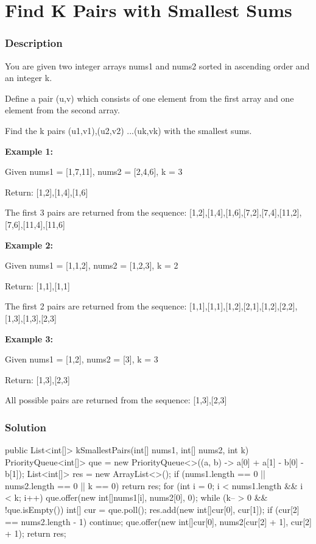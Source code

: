 \newpage

\section{Find K Pairs with Smallest Sums} %

\subsubsection{Description}
You are given two integer arrays nums1 and nums2 sorted in ascending order and an integer k.

Define a pair (u,v) which consists of one element from the first array and one element from the second array.

Find the k pairs (u1,v1),(u2,v2) ...(uk,vk) with the smallest sums.

\textbf{Example 1:}
\begin{Code}
Given nums1 = [1,7,11], nums2 = [2,4,6],  k = 3

Return: [1,2],[1,4],[1,6]

The first 3 pairs are returned from the sequence:
[1,2],[1,4],[1,6],[7,2],[7,4],[11,2],[7,6],[11,4],[11,6]
\end{Code}

\textbf{Example 2:}
\begin{Code}
Given nums1 = [1,1,2], nums2 = [1,2,3],  k = 2

Return: [1,1],[1,1]

The first 2 pairs are returned from the sequence:
[1,1],[1,1],[1,2],[2,1],[1,2],[2,2],[1,3],[1,3],[2,3]
\end{Code}

\textbf{Example 3:}
\begin{Code}
Given nums1 = [1,2], nums2 = [3],  k = 3

Return: [1,3],[2,3]

All possible pairs are returned from the sequence:
[1,3],[2,3]
\end{Code}
\subsubsection{Solution}

\begin{Code}
public List<int[]> kSmallestPairs(int[] nums1, int[] nums2, int k) {
    PriorityQueue<int[]> que = new PriorityQueue<>((a, b) -> a[0] + a[1] - b[0] - b[1]);
    List<int[]> res = new ArrayList<>();
    if (nums1.length == 0 || nums2.length == 0 || k == 0) return res;
    for (int i = 0; i < nums1.length && i < k; i++) que.offer(new int[]{nums1[i], nums2[0], 0});
    while (k-- > 0 && !que.isEmpty()) {
        int[] cur = que.poll();
        res.add(new int[]{cur[0], cur[1]});
        if (cur[2] == nums2.length - 1) continue;
        que.offer(new int[]{cur[0], nums2[cur[2] + 1], cur[2] + 1});
    }
    return res;
}
\end{Code}

